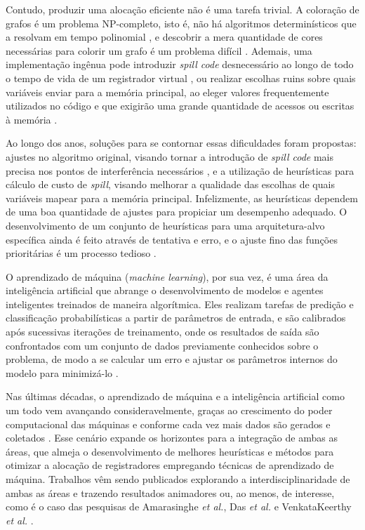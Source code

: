 \documentclass[
	12pt,				%
	openright,			%
	oneside,			%
	a4paper,			%
	tccpreliminar,			%
	]{ABNT-DC-UEL}
\begin{document}
Contudo, produzir uma alocação eficiente não é uma tarefa trivial. A coloração de grafos é um problema NP-completo, isto é, não há algoritmos determinísticos que a resolvam em tempo polinomial \cite{karp:72}, e descobrir a mera quantidade de cores necessárias para colorir um grafo é um problema difícil \cite{garey:76}. Ademais, uma implementação ingênua pode introduzir \textit{spill code} desnecessário ao longo de todo o tempo de vida de um registrador virtual \cite{bergner:97}, ou realizar escolhas ruins sobre quais variáveis enviar para a memória principal, ao eleger valores frequentemente utilizados no código e que exigirão uma grande quantidade de acessos ou escritas à memória \cite{bernstein:89}.

Ao longo dos anos, soluções para se contornar essas dificuldades foram propostas: ajustes no algoritmo original, visando tornar a introdução de \textit{spill code} mais precisa nos pontos de interferência necessários \cite{chaitin:82, briggs:92, briggs2:92, cooper:98}, e a utilização de heurísticas para cálculo de custo de \textit{spill}, visando melhorar a qualidade das escolhas de quais variáveis mapear para a memória principal. Infelizmente, as heurísticas dependem de uma boa quantidade de ajustes para propiciar um desempenho adequado. O desenvolvimento de um conjunto de heurísticas para uma arquitetura-alvo específica ainda é feito através de tentativa e erro, e o ajuste fino das funções prioritárias é um processo tedioso \cite{amarasinghe:03}.

O aprendizado de máquina (\textit{machine learning}), por sua vez, é uma área da inteligência artificial que abrange o desenvolvimento de modelos e agentes inteligentes treinados de maneira algorítmica. Eles realizam tarefas de predição e classificação probabilísticas a partir de parâmetros de entrada, e são calibrados após sucessivas iterações de treinamento, onde os resultados de saída são confrontados com um conjunto de dados previamente conhecidos sobre o problema, de modo a se calcular um erro e ajustar os parâmetros internos do modelo para minimizá-lo \cite{sharma:21}.

Nas últimas décadas, o aprendizado de máquina e a inteligência artificial como um todo vem avançando consideravelmente, graças ao crescimento do poder computacional das máquinas e conforme cada vez mais dados são gerados e coletados \cite{alpaydin:20}. Esse cenário expande os horizontes para a integração de ambas as áreas, que almeja o desenvolvimento de melhores heurísticas e métodos para otimizar a alocação de registradores empregando técnicas de aprendizado de máquina. Trabalhos vêm sendo publicados explorando a interdisciplinaridade de ambas as áreas e trazendo resultados animadores ou, ao menos, de interesse, como é o caso das pesquisas de Amarasinghe \textit{et al.}, Das \textit{et al.} e VenkataKeerthy \textit{et al.} \cite{amarasinghe:03, das:20, venkatakeerthy:23}.
\end{document}

